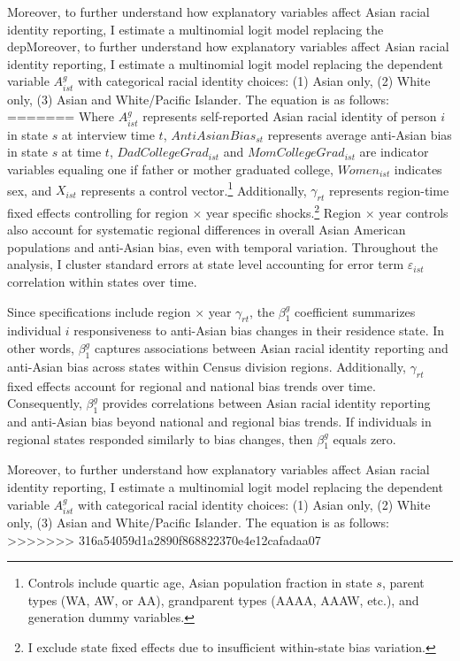 Moreover, to further understand how explanatory variables affect Asian racial identity reporting, I estimate a multinomial logit model replacing the depMoreover, to further understand how explanatory variables affect Asian racial identity reporting, I estimate a multinomial logit model replacing the dependent variable $A_{ist}^g$ with categorical racial identity choices: (1) Asian only, (2) White only, (3) Asian and White/Pacific Islander. The equation is as follows:
=======
Where $A_{ist}^g$ represents self-reported Asian racial identity of person $i$ in state $s$ at interview time $t$, $AntiAsianBias_{st}$ represents average anti-Asian bias in state $s$ at time $t$, $DadCollegeGrad_{ist}$ and $MomCollegeGrad_{ist}$ are indicator variables equaling one if father or mother graduated college, $Women_{ist}$ indicates sex, and $X_{ist}$ represents a control vector.\footnote{Controls include quartic age, Asian population fraction in state $s$, parent types (WA, AW, or AA), grandparent types (AAAA, AAAW, etc.), and generation dummy variables.} Additionally, $\gamma_{rt}$ represents region-time fixed effects controlling for region $\times$ year specific shocks.\footnote{I exclude state fixed effects due to insufficient within-state bias variation.} Region $\times$ year controls also account for systematic regional differences in overall Asian American populations and anti-Asian bias, even with temporal variation. Throughout the analysis, I cluster standard errors at state level accounting for error term $\varepsilon_{ist}$ correlation within states over time.

Since specifications include region $\times$ year $\gamma_{rt}$, the $\beta_1^g$ coefficient summarizes individual $i$ responsiveness to anti-Asian bias changes in their residence state. In other words, $\beta_1^g$ captures associations between Asian racial identity reporting and anti-Asian bias across states within Census division regions. Additionally, $\gamma_{rt}$ fixed effects account for regional and national bias trends over time. Consequently, $\beta_1^g$ provides correlations between Asian racial identity reporting and anti-Asian bias beyond national and regional bias trends. If individuals in regional states responded similarly to bias changes, then $\beta_1^g$ equals zero.

Moreover, to further understand how explanatory variables affect Asian racial identity reporting, I estimate a multinomial logit model replacing the dependent variable $A_{ist}^g$ with categorical racial identity choices: (1) Asian only, (2) White only, (3) Asian and White/Pacific Islander. The equation is as follows:
>>>>>>> 316a54059d1a2890f868822370e4e12cafadaa07

